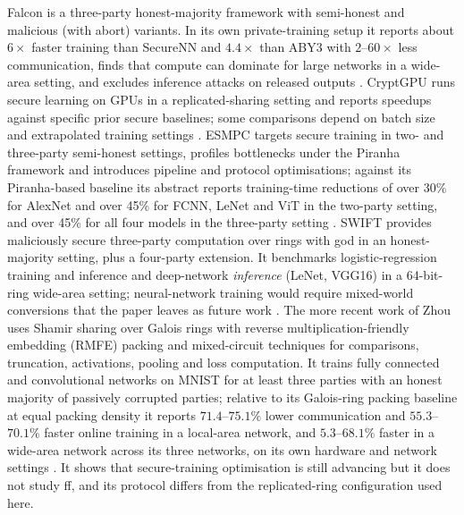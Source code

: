 Falcon is a three-party honest-majority framework with semi-honest and malicious (with abort) variants. In its own private-training setup it reports about $6\times$ faster training than SecureNN and $4.4\times$ than ABY3 with $2$--$60\times$ less communication, finds that compute can dominate for large networks in a wide-area setting, and excludes inference attacks on released outputs \cite{wagh2021falcon}. CryptGPU runs secure learning on GPUs in a replicated-sharing setting and reports speedups against specific prior secure baselines; some comparisons depend on batch size and extrapolated training settings \cite{tan2021cryptgpu}. ESMPC targets secure training in two- and three-party semi-honest settings, profiles bottlenecks under the Piranha framework and introduces pipeline and protocol optimisations; against its Piranha-based baseline its abstract reports training-time reductions of over 30\% for AlexNet and over 45\% for FCNN, LeNet and ViT in the two-party setting, and over 45\% for all four models in the three-party setting \cite{yang2025esmpc}. SWIFT provides maliciously secure three-party computation over rings with \ac{god} in an honest-majority setting, plus a four-party extension. It benchmarks logistic-regression training and inference and deep-network \emph{inference} (LeNet, VGG16) in a 64-bit-ring wide-area setting; neural-network training would require mixed-world conversions that the paper leaves as future work \cite{koti2021swift}. The more recent work of Zhou uses Shamir sharing over Galois rings with reverse multiplication-friendly embedding (RMFE) packing and mixed-circuit techniques for comparisons, truncation, activations, pooling and loss computation. It trains fully connected and convolutional networks on MNIST for at least three parties with an honest majority of passively corrupted parties; relative to its Galois-ring packing baseline at equal packing density it reports $71.4$--$75.1\%$ lower communication and $55.3$--$70.1\%$ faster online training in a local-area network, and $5.3$--$68.1\%$ faster in a wide-area network across its three networks, on its own hardware and network settings \cite{zhou2026rmfe}. It shows that secure-training optimisation is still advancing but it does not study \ac{ff}, and its protocol differs from the replicated-ring configuration used here.

